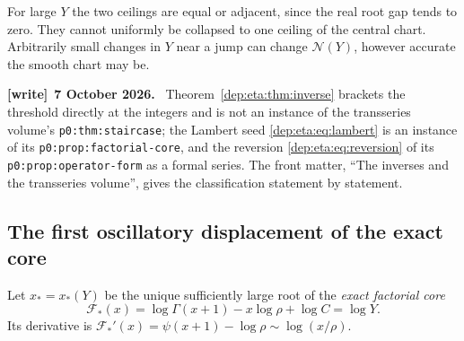 \documentclass[11pt]{article}
\theoremstyle{definition}\newtheorem{definition}[theorem]{Definition}
\theoremstyle{remark}\newtheorem{remark}[theorem]{Remark}
\newcommand{\file}[1]{\nolinkurl{#1}}
\newenvironment{writenote}[1][]{\par\smallskip\begingroup\small
 \noindent\textbf{[write]}\if\relax\detokenize{#1}\relax\else~\textbf{#1.}\fi\ }%
 {\par\endgroup\smallskip}
\begin{document}
For large $Y$ the two ceilings are equal or adjacent, since the real
root gap tends to zero. They cannot uniformly be collapsed to one
ceiling of the central chart. Arbitrarily small changes in $Y$ near
a jump can change $\mathcal N(Y)$, however accurate the smooth chart
may be.

\begin{writenote}[7 October 2026]
Theorem~\ref{dep:eta:thm:inverse} brackets the threshold directly at the integers and is not an instance of the transseries volume's \file{p0:thm:staircase}; the Lambert seed \eqref{dep:eta:eq:lambert} is an instance of its \file{p0:prop:factorial-core}, and the reversion \eqref{dep:eta:eq:reversion} of its \file{p0:prop:operator-form} as a formal series. The front matter, ``The inverses and the transseries volume'', gives the classification statement by statement.
\end{writenote}

\subsection{The first oscillatory displacement of the exact core}
Let $x_*=x_*(Y)$ be the unique sufficiently large root of the
\emph{exact factorial core}
\begin{equation}\label{dep:eta:eq:core}
 \mathcal F_*(x)=\log\Gamma(x+1)-x\log\rho+\log C=\log Y.
\end{equation}
Its derivative is
$\mathcal F_*'(x)=\psi(x+1)-\log\rho\sim\log(x/\rho)$.
\end{document}
